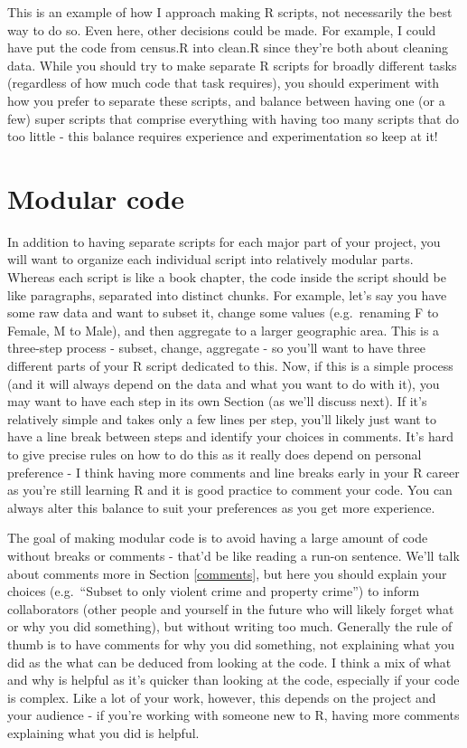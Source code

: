 \documentclass[
]{krantz}
\begin{document}
This is an example of how I approach making R scripts, not necessarily the best way to do so. Even here, other decisions could be made. For example, I could have put the code from census.R into clean.R since they're both about cleaning data. While you should try to make separate R scripts for broadly different tasks (regardless of how much code that task requires), you should experiment with how you prefer to separate these scripts, and balance between having one (or a few) super scripts that comprise everything with having too many scripts that do too little - this balance requires experience and experimentation so keep at it!

\hypertarget{modular-code}{%
\section{Modular code}\label{modular-code}}

In addition to having separate scripts for each major part of your project, you will want to organize each individual script into relatively modular parts. Whereas each script is like a book chapter, the code inside the script should be like paragraphs, separated into distinct chunks. For example, let's say you have some raw data and want to subset it, change some values (e.g.~renaming F to Female, M to Male), and then aggregate to a larger geographic area. This is a three-step process - subset, change, aggregate - so you'll want to have three different parts of your R script dedicated to this. Now, if this is a simple process (and it will always depend on the data and what you want to do with it), you may want to have each step in its own Section (as we'll discuss next). If it's relatively simple and takes only a few lines per step, you'll likely just want to have a line break between steps and identify your choices in comments. It's hard to give precise rules on how to do this as it really does depend on personal preference - I think having more comments and line breaks early in your R career as you're still learning R and it is good practice to comment your code. You can always alter this balance to suit your preferences as you get more experience.

The goal of making modular code is to avoid having a large amount of code without breaks or comments - that'd be like reading a run-on sentence. We'll talk about comments more in Section \ref{comments}, but here you should explain your choices (e.g.~``Subset to only violent crime and property crime'') to inform collaborators (other people and yourself in the future who will likely forget what or why you did something), but without writing too much. Generally the rule of thumb is to have comments for why you did something, not explaining what you did as the what can be deduced from looking at the code. I think a mix of what and why is helpful as it's quicker than looking at the code, especially if your code is complex. Like a lot of your work, however, this depends on the project and your audience - if you're working with someone new to R, having more comments explaining what you did is helpful.
\end{document}
